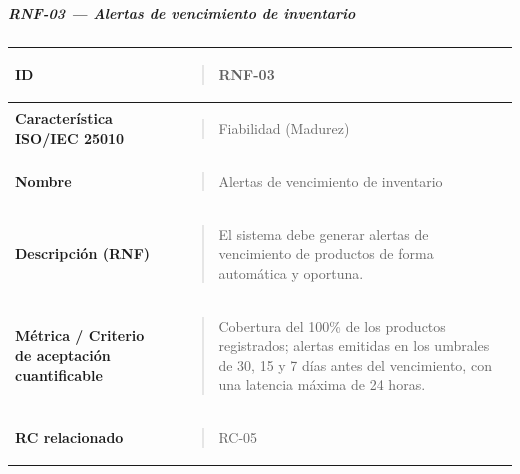 \documentclass[
]{article}
\newcounter{none} %
\begin{document}
\subparagraph{RNF-03 --- Alertas de vencimiento de
inventario}\label{rnf-03-alertas-de-vencimiento-de-inventario}

{\def\LTcaptype{none} %
\begin{longtable}[]{@{}
  >{\raggedright\arraybackslash}p{}
  >{\raggedright\arraybackslash}p{}@{}}
\toprule\noalign{}
\begin{minipage}[b]{\linewidth}\raggedright
\textbf{ID}
\end{minipage} & \begin{minipage}[b]{\linewidth}\raggedright
\begin{quote}
RNF-03
\end{quote}
\end{minipage} \\
\midrule\noalign{}
\endhead
\bottomrule\noalign{}
\endlastfoot
\textbf{Característica ISO/IEC 25010} & \begin{minipage}[t]{\linewidth}\raggedright
\begin{quote}
Fiabilidad (Madurez)
\end{quote}
\end{minipage} \\
\textbf{Nombre} & \begin{minipage}[t]{\linewidth}\raggedright
\begin{quote}
Alertas de vencimiento de inventario
\end{quote}
\end{minipage} \\
\textbf{Descripción (RNF)} & \begin{minipage}[t]{\linewidth}\raggedright
\begin{quote}
El sistema debe generar alertas de vencimiento de productos de forma
automática y oportuna.
\end{quote}
\end{minipage} \\
\textbf{Métrica / Criterio de aceptación cuantificable} & \begin{minipage}[t]{\linewidth}\raggedright
\begin{quote}
Cobertura del 100\% de los productos registrados; alertas emitidas en
los umbrales de 30, 15 y 7 días antes del vencimiento, con una latencia
máxima de 24 horas.
\end{quote}
\end{minipage} \\
\textbf{RC relacionado} & \begin{minipage}[t]{\linewidth}\raggedright
\begin{quote}
RC-05
\end{quote}
\end{minipage} \\
\end{longtable}
}
\end{document}
